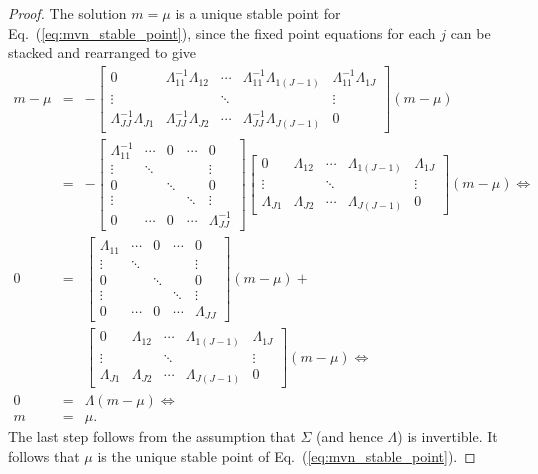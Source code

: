 \documentclass{article}\usepackage[]{graphicx}\usepackage[]{color}
\newcommand{\eq}[1]{Eq.~(\ref{eq:#1})}
\theoremstyle{plain}
\begin{document}
\begin{proof}
The solution $m = \mu$ is a unique stable point for \eq{mvn_stable_point}, since
the fixed point equations for each $j$ can be stacked and rearranged to give
%
\begin{eqnarray*}
m-\mu & = & -\left[\begin{array}{ccccc}
0 & \Lambda_{11}^{-1}\Lambda_{12} & \cdots & \Lambda_{11}^{-1}\Lambda_{1\left(J-1\right)} & \Lambda_{11}^{-1}\Lambda_{1J}\\
\vdots &  & \ddots &  & \vdots\\
\Lambda_{JJ}^{-1}\Lambda_{J1} & \Lambda_{JJ}^{-1}\Lambda_{J2} & \cdots & \Lambda_{JJ}^{-1}\Lambda_{J\left(J-1\right)} & 0
\end{array}\right]\left(m-\mu\right)\\
 & = & -\left[\begin{array}{ccccc}
\Lambda_{11}^{-1} & \cdots & 0 & \cdots & 0\\
\vdots & \ddots &  &  & \vdots\\
0 &  & \ddots &  & 0\\
\vdots &  &  & \ddots & \vdots\\
0 & \cdots & 0 & \cdots & \Lambda_{JJ}^{-1}
\end{array}\right]\left[\begin{array}{ccccc}
0 & \Lambda_{12} & \cdots & \Lambda_{1\left(J-1\right)} & \Lambda_{1J}\\
\vdots &  & \ddots &  & \vdots\\
\Lambda_{J1} & \Lambda_{J2} & \cdots & \Lambda_{J\left(J-1\right)} & 0
\end{array}\right]\left(m-\mu\right)\Leftrightarrow\\
0 & = & \left[\begin{array}{ccccc}
\Lambda_{11} & \cdots & 0 & \cdots & 0\\
\vdots & \ddots &  &  & \vdots\\
0 &  & \ddots &  & 0\\
\vdots &  &  & \ddots & \vdots\\
0 & \cdots & 0 & \cdots & \Lambda_{JJ}
\end{array}\right]\left(m-\mu\right) +\\
&& \left[\begin{array}{ccccc}
0 & \Lambda_{12} & \cdots & \Lambda_{1\left(J-1\right)} & \Lambda_{1J}\\
\vdots &  & \ddots &  & \vdots\\
\Lambda_{J1} & \Lambda_{J2} & \cdots & \Lambda_{J\left(J-1\right)} & 0
\end{array}\right]\left(m-\mu\right)\Leftrightarrow\\
0 & = & \Lambda \left(m-\mu\right) \Leftrightarrow\\
m & = & \mu.
\end{eqnarray*}
%
The last step follows from the assumption that $\Sigma$ (and hence $\Lambda$)
is invertible.  It follows that $\mu$ is the unique stable point of
\eq{mvn_stable_point}.

\end{proof}
\end{document}
